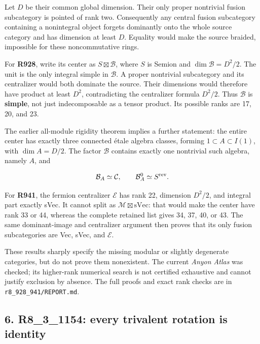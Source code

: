 \documentclass[
  11pt,
]{article}
\begin{document}
Let \(D\) be their common global dimension. Their only proper nontrivial
fusion subcategory is pointed of rank two. Consequently any central
fusion subcategory containing a nonintegral object forgets dominantly
onto the whole source category and has dimension at least \(D\).
Equality would make the source braided, impossible for these
noncommutative rings.

For \textbf{R928}, write its center as \(S\boxtimes\mathcal B\), where
\(S\) is Semion and \(\dim\mathcal B=D^2/2\). The unit is the only
integral simple in \(\mathcal B\). A proper nontrivial subcategory and
its centralizer would both dominate the source. Their dimensions would
therefore have product at least \(D^2\), contradicting the centralizer
formula \(D^2/2\). Thus \(\mathcal B\) is \textbf{simple}, not just
indecomposable as a tensor product. Its possible ranks are 17, 20, and
23.

The earlier all-module rigidity theorem implies a further statement: the
entire center has exactly three connected étale algebra classes, forming
\(1\subset A\subset I(1)\), with \(\dim A=D/2\). The factor
\(\mathcal B\) contains exactly one nontrivial such algebra, namely
\(A\), and

\[
\mathcal B_A\simeq\mathcal C,\qquad
\mathcal B_A^0\simeq S^{\rm rev}.
\]

For \textbf{R941}, the fermion centralizer \(\mathcal E\) has rank 22,
dimension \(D^2/2\), and integral part exactly sVec. It cannot split as
\(\mathcal M\boxtimes\mathrm{sVec}\): that would make the center have
rank 33 or 44, whereas the complete retained list gives 34, 37, 40, or
43. The same dominant-image and centralizer argument then proves that
its only fusion subcategories are Vec, sVec, and \(\mathcal E\).

These results sharply specify the missing modular or slightly degenerate
categories, but do not prove them nonexistent. The current \emph{Anyon
Atlas} was checked; its higher-rank numerical search is not certified
exhaustive and cannot justify exclusion by absence. The full proofs and
exact rank checks are in \texttt{r8\_928\_941/REPORT.md}.

\hypertarget{r8_3_1154-every-trivalent-rotation-is-identity}{%
\subsection{6. R8\_3\_1154: every trivalent rotation is
identity}\label{r8_3_1154-every-trivalent-rotation-is-identity}}
\end{document}
